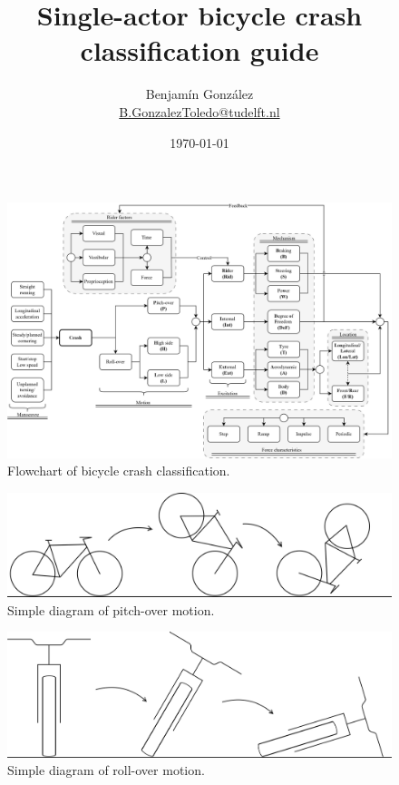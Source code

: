 \documentclass{article}
\title{Single-actor bicycle crash classification guide}
\author{
  Benjam\'in Gonz\'alez\\
  \small{\href{mailto:b.gonzaleztoledo@tudelft.nl}{B.GonzalezToledo@tudelft.nl}}
  }
\date{\today}
\begin{document}
\maketitle

\begin{figure}
    \centering
    \includegraphics[width = \textwidth]{class-mindmap-v3.png}
    \caption{Flowchart of bicycle crash classification.}
    \label{fig: flowchart}
\end{figure}


\begin{figure}[h]
    \centering
    \includegraphics[width=\linewidth]{pitch-over.png}
    \caption{Simple diagram of pitch-over motion.}
    \label{fig: pitchover}
\end{figure}

\begin{figure}[h]
    \centering
    \includegraphics[width=\linewidth]{roll-over.png}
    \caption{Simple diagram of roll-over motion.}
    \label{fig: rollover}
\end{figure}
\end{document}
